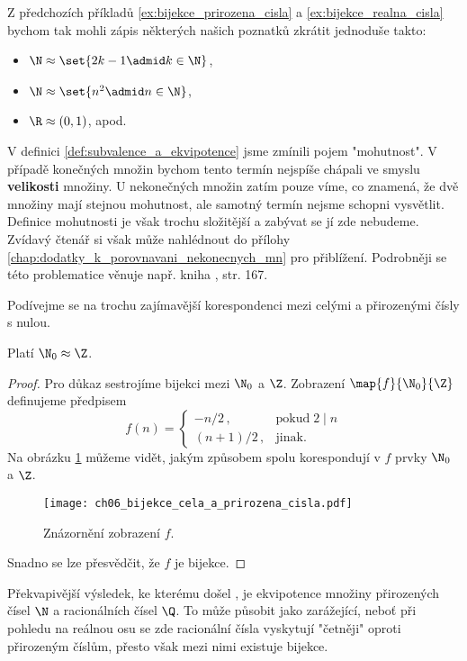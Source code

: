 Z předchozích příkladů \ref{ex:bijekce_prirozena_cisla} a \ref{ex:bijekce_realna_cisla} bychom tak mohli zápis některých našich poznatků zkrátit jednoduše takto:
\begin{itemize}
    \item $\N\approx\set{2k-1\admid k\in\N}$,
    \item $\N\approx\set{n^2\admid n\in\N}$,
    \item $\R\approx(0,1)$, apod.
\end{itemize}
V definici \ref{def:subvalence_a_ekvipotence} jsme zmínili pojem "mohutnost". V případě konečných množin bychom tento termín nejspíše chápali ve smyslu \textbf{velikosti} množiny. U nekonečných množin zatím pouze víme, co znamená, že dvě množiny mají stejnou mohutnost, ale samotný termín nejsme schopni vysvětlit. Definice mohutnosti je však trochu složitější a zabývat se jí zde nebudeme. Zvídavý čtenář si však může nahlédnout do přílohy \ref{chap:dodatky_k_porovnavani_nekonecnych_mn} pro přiblížení. Podrobněji se této problematice věnuje např. kniha \cite{Potter2009}, str. 167.\par
Podívejme se na trochu zajímavější korespondenci mezi celými a přirozenými čísly s nulou.
\begin{theorem}\label{thm:N_a_Z}
    Platí $\N_0\approx\Z$.
\end{theorem}
\begin{proof}
    Pro důkaz sestrojíme bijekci mezi $\N_0$ a $\Z$. Zobrazení $\map{f}{\N_0}{\Z}$ definujeme předpisem
    \begin{equation*}
        f(n)=\left\{
        \begin{array}{ll}
            -n/2\,, & \text{pokud}\;2\mid n\\
            (n+1)/2\,, & \text{jinak}.
        \end{array}
        \right.
    \end{equation*}
    Na obrázku \ref{fig:bijekce_cela_a_prirozena_cisla} můžeme vidět, jakým způsobem spolu korespondují v $f$ prvky $\N_0$ a $\Z$.
    \begin{figure}[H]
        \centering
        \texttt{[image: ch06\_bijekce\_cela\_a\_prirozena\_cisla.pdf]}
        \caption{Znázornění zobrazení $f$.}
        \label{fig:bijekce_cela_a_prirozena_cisla}
    \end{figure}
    Snadno se lze přesvědčit, že $f$ je bijekce.
\end{proof}
Překvapivější výsledek, ke kterému došel , je ekvipotence množiny přirozených čísel $\N$ a racionálních čísel $\Q$. To může působit jako zarážející, neboť při pohledu na reálnou osu se zde racionální čísla vyskytují "četněji" oproti přirozeným číslům, přesto však mezi nimi existuje bijekce.
